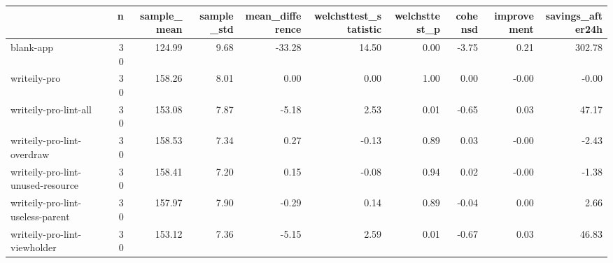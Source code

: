 \begin{tabular}{lrrrrrrrrr}
\toprule
{} &   n &  sample\_mean &  sample\_std &  mean\_difference &  welchsttest\_statistic &  welchsttest\_p &  cohensd &  improvement &  savings\_after24h \\
\midrule
blank-app                         &  30 &       124.99 &        9.68 &           -33.28 &                  14.50 &           0.00 &    -3.75 &         0.21 &            302.78 \\
writeily-pro                      &  30 &       158.26 &        8.01 &             0.00 &                   0.00 &           1.00 &     0.00 &        -0.00 &             -0.00 \\
writeily-pro-lint-all             &  30 &       153.08 &        7.87 &            -5.18 &                   2.53 &           0.01 &    -0.65 &         0.03 &             47.17 \\
writeily-pro-lint-overdraw        &  30 &       158.53 &        7.34 &             0.27 &                  -0.13 &           0.89 &     0.03 &        -0.00 &             -2.43 \\
writeily-pro-lint-unused-resource &  30 &       158.41 &        7.20 &             0.15 &                  -0.08 &           0.94 &     0.02 &        -0.00 &             -1.38 \\
writeily-pro-lint-useless-parent  &  30 &       157.97 &        7.90 &            -0.29 &                   0.14 &           0.89 &    -0.04 &         0.00 &              2.66 \\
writeily-pro-lint-viewholder      &  30 &       153.12 &        7.36 &            -5.15 &                   2.59 &           0.01 &    -0.67 &         0.03 &             46.83 \\
\bottomrule
\end{tabular}

